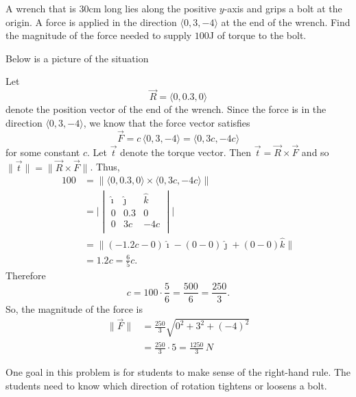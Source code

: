 \documentclass[]{ximera}
\begin{document}
\begin{problem}
A wrench that is $30$cm long lies along the positive $y$-axis and grips a bolt at the origin.  
A force is applied in the direction $\langle 0,3,-4 \rangle$ at the end of the wrench.  
Find the magnitude of the force needed to supply $100$J of torque to the bolt.
	\begin{freeResponse}
	Below is a picture of the situation
		
		
	Let
		\[
		\vec{R} = \langle 0, 0.3,0 \rangle 
		\]
	denote the position vector of the end of the wrench.  
	Since the force is in the direction $\langle 0,3,-4 \rangle$, we know that the force vector satisfies
		\[
		\vec{F} = c \, \langle 0,3,-4 \rangle = \langle 0, 3c, -4c \rangle
		\]
	for some constant $c$.
	Let $\vec{t}$ denote the torque vector.  
	Then $\vec{t} = \vec{R} \times \vec{F}$ and so $\| \vec{t} \| = \| \vec{R} \times \vec{F} \|$.
	Thus,
		\begin{align*}
		100 &= \| \langle 0,0.3,0 \rangle \times \langle 0,3c,-4c \rangle \|  \\
		&= 
		\biggr| \begin{vmatrix}
		\hat{\imath}	&	\hat{\jmath}	&	\hat{k}	\\
		0		&	0.3		&	0		\\
		0		&	3c		&	-4c		\\
		\end{vmatrix}  \biggr|  \\
		&= \| (-1.2c - 0) \hat{\imath} - (0-0) \hat{\jmath} + (0-0) \hat{k} \|  \\
		&= 1.2 c = \frac{6}{5} c.
		\end{align*}
	Therefore
		\[
		c = 100 \cdot \frac{5}{6} = \frac{500}{6} = \frac{250}{3}.
		\]
	So, the magnitude of the force is
		\begin{align*}
		\| \vec{F} \|
		&= \frac{250}{3} \sqrt{0^2 + 3^2 + (-4)^2}  \\
		&= \frac{250}{3} \cdot 5 = \boxed{\frac{1250}{3} \, N}
		\end{align*}
	\end{freeResponse}

\end{problem}

\begin{instructorNotes}
One goal in this problem is for students to make sense of the right-hand rule.  
The students need to know which direction of rotation tightens or loosens a bolt.  
\end{instructorNotes}
















	
	
	
	
	
	
	
	
	

	










								
				
				
	
\end{document}
